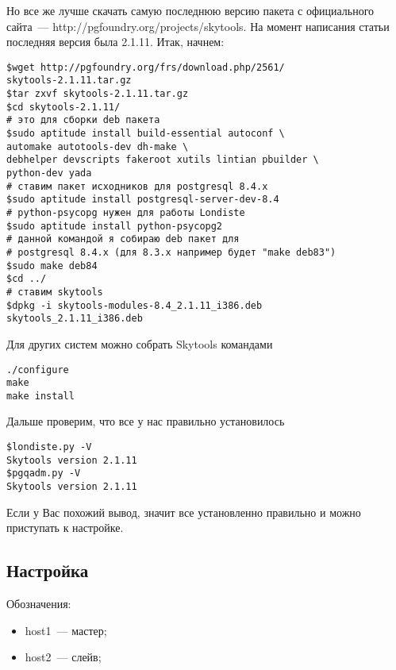 Но все же лучше скачать самую последнюю версию пакета с официального сайта~--- http://pgfoundry.org/projects/skytools. 
На момент написания статьи последняя версия была 2.1.11. Итак, начнем:

\begin{lstlisting}[label=lst:londiste2,caption=Установка]
$wget http://pgfoundry.org/frs/download.php/2561/
skytools-2.1.11.tar.gz
$tar zxvf skytools-2.1.11.tar.gz
$cd skytools-2.1.11/
# это для сборки deb пакета
$sudo aptitude install build-essential autoconf \ 
automake autotools-dev dh-make \ 
debhelper devscripts fakeroot xutils lintian pbuilder \
python-dev yada
# ставим пакет исходников для postgresql 8.4.x
$sudo aptitude install postgresql-server-dev-8.4
# python-psycopg нужен для работы Londiste
$sudo aptitude install python-psycopg2
# данной командой я собираю deb пакет для 
# postgresql 8.4.x (для 8.3.x например будет "make deb83")
$sudo make deb84
$cd ../
# ставим skytools
$dpkg -i skytools-modules-8.4_2.1.11_i386.deb 
skytools_2.1.11_i386.deb
\end{lstlisting}

Для других систем можно собрать Skytools командами 

\begin{lstlisting}[label=lst:londiste3,caption=Установка]
./configure
make
make install
\end{lstlisting}

Дальше проверим, что все у нас правильно установилось
\begin{lstlisting}[label=lst:londiste4,caption=Установка]
$londiste.py -V
Skytools version 2.1.11
$pgqadm.py -V
Skytools version 2.1.11
\end{lstlisting}

Если у Вас похожий вывод, значит все установленно правильно и можно приступать к настройке.


\subsection{Настройка}
Обозначения: 
\begin{itemize}
\item host1~--- мастер; 
\item host2~--- слейв;
\end{itemize}


